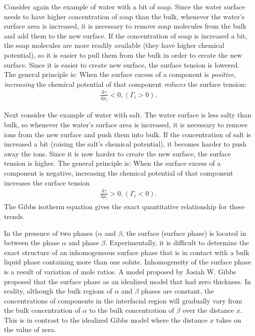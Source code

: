 Consider again the example of water with a bit of soap. Since the water surface needs to have higher concentration of soap than the bulk,
whenever the water's surface area is increased, it is necessary to remove soap molecules from the bulk and add them to the new surface. 
If the concentration of soap is increased a bit, the soap molecules are more readily available (they have higher chemical potential), 
so it is easier to pull them from the bulk in order to create the new surface. Since it is easier to create new surface, the surface tension is lowered. 
The general principle is: When the surface excess of a component is \emph{positive}, \emph{increasing} the chemical potential of that component 
\emph{reduces} the surface tension:
\begin{eqnarray}
\frac{\mathrm{d}\gamma}{\mathrm{d}\mu_i} < 0, (\Gamma_i > 0).
\label{2}
\end{eqnarray}

Next consider the example of water with salt. The water surface is less salty than bulk, so whenever the water's surface area is increased, 
it is necessary to remove ions from the new surface and push them into bulk. If the concentration of salt is increased a bit 
(raising the salt's chemical potential), it becomes harder to push away the ions. Since it is now harder to create the new surface, 
the surface tension is higher. The general principle is:
When the surface excess of a component is negative, increasing the chemical potential of that component increases the surface tension
\begin{eqnarray}
\frac{\mathrm{d}\gamma}{\mathrm{d}\mu_i} > 0, (\Gamma_i < 0).
\label{3}
\end{eqnarray}
The Gibbs isotherm equation gives the exact quantitative relationship for these trends.

In the presence of two phases ($\alpha$ and $\beta$, the surface (surface phase) is located in between the phase $\alpha$ and phase $\beta$.
Experimentally, it is difficult to determine the exact structure of an inhomogeneous surface phase that is in contact with a bulk liquid phase 
containing more than one solute. Inhomogeneity of the surface phase is a result of variation of mole ratios. A model proposed by Josiah W. Gibbs 
proposed that the surface phase as an idealized model that had zero thickness. In reality, although the bulk regions of $\alpha$ and $\beta$ phases 
are constant, the concentrations of components in the interfacial region will gradually vary from the bulk concentration of $\alpha$ to the bulk 
concentration of $\beta$ over the distance $x$. This is in contrast to the idealized Gibbs model where the distance $x$ takes on the value of zero.

